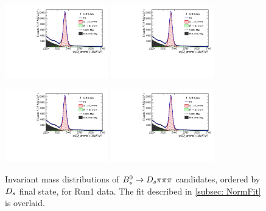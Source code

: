 \begin{figure}[h]
\includegraphics[height=!,width=0.4\textwidth]{figs/MassFit/norm_y12_phipi.pdf}
\includegraphics[height=!,width=0.4\textwidth]{figs/MassFit/norm_y12_KsK.pdf}

\includegraphics[height=!,width=0.4\textwidth]{figs/MassFit/norm_y12_KKpi_NR.pdf}
\includegraphics[height=!,width=0.4\textwidth]{figs/MassFit/norm_y12_pipipi.pdf}
\caption{Invariant mass distributions of ${{B}^0_{s}}\rightarrow{\ensuremath{{D}_{s}}}{\ensuremath{\pi}}{\ensuremath{\pi}}{\ensuremath{\pi}}$ candidates, ordered by ${{D}_{s}}$ final state, for Run1 data.
The fit described in \ref{subsec: NormFit} is overlaid.}
\label{fig:massfits_norm_Run1}
\end{figure}

\clearpage

